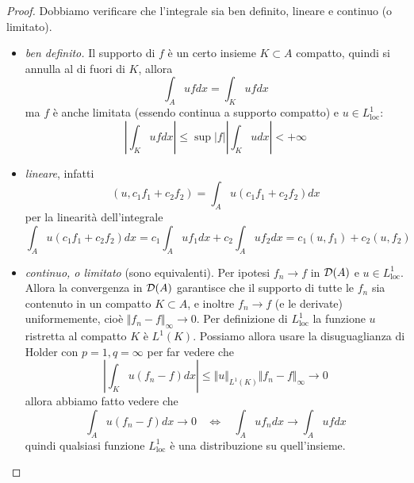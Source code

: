 \begin{proof}

Dobbiamo verificare che l'integrale sia ben definito, lineare e continuo (o limitato).
\begin{itemize}
\item \textit{ben definito.} Il supporto di $f$ è un certo insieme $K\subset A$ compatto, quindi si annulla al di fuori di $K$, allora
\begin{equation*}
\int_{A} ufdx = \int_{K} ufdx
\end{equation*}ma $f$ è anche limitata (essendo continua a supporto compatto) e $u\in L^{1}_{\mathrm{loc}}$:
\begin{equation*}
\left| \int_{K} ufdx\right| \leq \sup | f| \left| \int_{K} udx\right| < + \infty
\end{equation*}
\item \textit{lineare}, infatti
\begin{equation*}
(u, c_{1} f_{1} + c_{2} f_{2}) = \int_{A} u(c_{1} f_{1} + c_{2} f_{2}) dx
\end{equation*}per la linearità dell'integrale
\begin{equation*}
\int_{A} u(c_{1} f_{1} + c_{2} f_{2}) dx = c_{1}\int_{A} uf_{1} dx + c_{2}\int_{A} uf_{2} dx = c_{1}(u, f_{1}) + c_{2}(u, f_{2})
\end{equation*}
\item \textit{continuo, o limitato} (sono equivalenti). Per ipotesi $f_{n}\rightarrow f$ in $\mathcal{D}(A)$ e $u\in L^{1}_{\mathrm{loc}}$. Allora la convergenza in $\mathcal{D}(A)$ garantisce che il supporto di tutte le $f_{n}$ sia contenuto in un compatto $K\subset A$, e inoltre $f_{n}\rightarrow f$ (e le derivate) uniformemente, cioè $ \Vert f_{n} - f \Vert_{\infty}\rightarrow 0$. Per definizione di $L^{1}_{\mathrm{loc}}$ la funzione $u$ ristretta al compatto $K$ è $L^{1}(K)$. Possiamo allora usare la disuguaglianza di Holder con $p = 1, q = \infty $ per far vedere che
\begin{equation*}
\left| \int_{K} u(f_{n} - f) dx\right| \leq \Vert u \Vert_{L^{1}(K)} \Vert f_{n} - f \Vert_{\infty}\rightarrow 0
\end{equation*}allora abbiamo fatto vedere che
\begin{equation*}
\int_{A} u(f_{n} - f) dx\rightarrow 0\ \ \ \ \iff \ \ \ \ \int_{A} uf_{n} dx\rightarrow \int_{A} ufdx
\end{equation*}quindi qualsiasi funzione $L^{1}_{\mathrm{loc}}$ è una distribuzione su quell'insieme.
\end{itemize}
\end{proof}

